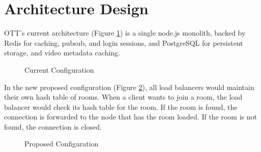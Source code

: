 \newpage

\section{Architecture Design}

OTT's current architecture (Figure \ref{Figure::old-architecture}) is a single node.js monolith, backed by Redis
for caching, pubsub, and login sessions, and PostgreSQL for persistent
storage, and video metadata caching.

\begin{figure}[htb]
  \centering
  \caption{\label{Figure::old-architecture} Current Configuration}
\end{figure}

In the new proposed configuration (Figure \ref{Figure::new-architecture}), all
load balancers would maintain their own hash table of rooms. When a client
wants to join a room, the load balancer would check its hash table for the
room. If the room is found, the connection is forwarded to the node that
has the room loaded. If the room is not found, the connection is closed.

\begin{figure}[htb]
  \centering
{}
\caption{\label{Figure::new-architecture} Proposed Configuration}
\end{figure}

